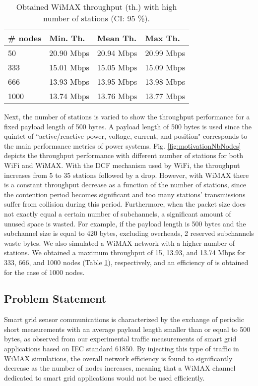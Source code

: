 \documentclass[journal,10pt,draftclsnofoot,onecolumn]{IEEEtran}
\begin{document}
\begin{table}
\caption{Obtained WiMAX throughput (th.) with high number of stations (CI: 95 \%).}
\label{table:resultsWiMAXNbNodes}
\begin{center}
{\renewcommand{\arraystretch}{1.2}
    \begin{tabular}{ | l | l | l | l |}
    \hline
    \# nodes & Min. Th. & Mean Th. & Max Th.  \\ \hline
	50 & 20.90 Mbps & 20.94 Mbps & 20.99 Mbps \\\hline
	333 & 15.01 Mbps & 15.05 Mbps & 15.09 Mbps \\\hline
	666 & 13.93 Mbps & 13.95 Mbps & 13.98 Mbps \\\hline
	1000 & 13.74 Mbps & 13.76 Mbps & 13.77 Mbps \\\hline
    \end{tabular}
}
\end{center}
\end{table}

Next, the number of stations is varied to show the throughput performance for a fixed payload length of 500 bytes. A payload length of 500 bytes is used since the quintet of ``active/reactive power, voltage, current, and position" corresponds to the main performance metrics of power systems. Fig. \ref{fig:motivationNbNodes} depicts the throughput performance with different number of stations for both WiFi and WiMAX. With the DCF mechanism used by WiFi, the throughput increases from 5 to 35 stations followed by a drop. However, with WiMAX there is a constant throughput decrease as a function of the number of stations, since the contention period becomes significant and too many stations' transmissions suffer from collision during this period. Furthermore, when the packet size does not exactly equal a certain number of subchannels, a significant amount of unused space is wasted. For example, if the payload length is 500 bytes and the subchannel size is equal to 420 bytes, excluding overheads, 2 reserved subchannels waste  bytes. We also simulated a WiMAX network with a higher number of stations. We obtained a maximum throughput of 15, 13.93, and 13.74 Mbps for 333, 666, and 1000 nodes (Table \ref{table:resultsWiMAXNbNodes}), respectively, and an efficiency of  is obtained for the case of 1000 nodes.

\subsection{Problem Statement}
Smart grid sensor communications is characterized by the exchange of periodic short measurements with an average payload length smaller than or equal to 500 bytes, as observed from our experimental traffic measurements of smart grid applications based on IEC standard 61850. By injecting this type of traffic in WiMAX simulations, the overall network efficiency is found to significantly decrease as the number of nodes increases, meaning that a WiMAX channel dedicated to smart grid applications would not be used efficiently. 
\end{document}
